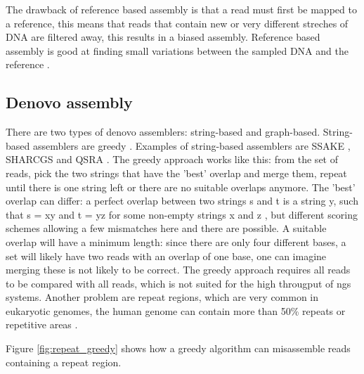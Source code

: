 \documentclass[../main/thesis.tex]{subfiles}
\begin{document}
The drawback of reference based assembly is that a read must first be mapped to a reference, this means that reads that contain new or very different streches of DNA are filtered away, this results in a biased assembly.
Reference based assembly is good at finding small variations between the sampled DNA and the reference \cite{denovo_vs_reference}.

\subsection{Denovo assembly}


There are two types of denovo assemblers: string-based and graph-based.
String-based assemblers are greedy \cite{denovo1}.
Examples of string-based assemblers are SSAKE \cite{ssake}, SHARCGS \cite{sharcgs} and QSRA \cite{qsra}.
The greedy approach works like this: from the set of reads, pick the two strings that have the 'best' overlap and merge them, repeat until there is one string left or there are no suitable overlaps anymore.
The 'best' overlap can differ: a perfect overlap between two strings s and t is a string y, such that s = xy and t = yz for some non-empty strings x and z \cite{denovo2}, but different scoring schemes allowing a few mismatches here and there are possible.
A suitable overlap will have a minimum length: since there are only four different bases, a set will likely have two reads with an overlap of one base, one can imagine merging these is not likely to be correct.
The greedy approach requires all reads to be compared with all reads, which is not suited for the high througput of ngs systems.
Another problem are repeat regions, which are very common in eukaryotic genomes, the human genome can contain more than 50\% repeats or repetitive areas \cite{repeats1}\cite{repeats2}.

Figure \ref{fig:repeat_greedy} shows how a greedy algorithm can misassemble reads containing a repeat region.

\end{document}
